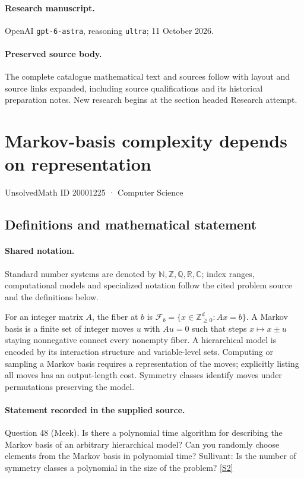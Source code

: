 \documentclass[11pt]{article}
\begin{document}
\paragraph{Research manuscript.} OpenAI \texttt{gpt-6-astra}, reasoning \texttt{ultra}; 11 October 2026.
\paragraph{Preserved source body.} The complete catalogue mathematical text and sources follow with layout and source links expanded, including source qualifications and its historical preparation notes. New research begins at the section headed Research attempt.

\section{Markov-basis complexity depends on representation}\label{20001225}
{\small UnsolvedMath ID 20001225 · Computer Science}
\subsection{Definitions and mathematical statement}

\paragraph{Shared notation.}Standard number systems are denoted by $\mathbb N,\mathbb Z,\mathbb Q,\mathbb R,\mathbb C$; index ranges, computational models and specialized notation follow the cited problem source and the definitions below.


For an integer matrix $A$, the fiber at $b$ is $\mathcal F_b=\{x\in\mathbb Z_{\ge0}^d:Ax=b\}$. A Markov basis is a finite set of integer moves $u$ with $Au=0$ such that steps $x\mapsto x\pm u$ staying nonnegative connect every nonempty fiber. A hierarchical model is encoded by its interaction structure and variable-level sets. Computing or sampling a Markov basis requires a representation of the moves; explicitly listing all moves has an output-length cost. Symmetry classes identify moves under permutations preserving the model.
\paragraph{Statement recorded in the supplied source.}
Question 48 (Meek). Is there a polynomial time algorithm for describing the Markov basis of an arbitrary hierarchical model? Can you randomly choose elements from the Markov basis in polynomial time? Sullivant: Is the number of symmetry classes a polynomial in the size of the problem? \href{https://aimath.org/WWN/compalgstat/compalgstat.pdf}{[S2]}
\end{document}
